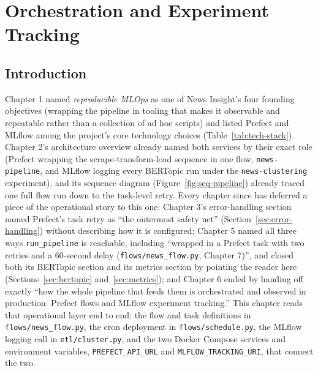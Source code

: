 \chapter{Orchestration and Experiment Tracking}

\section{Introduction}
\label{sec:orch-intro}
\begin{sloppypar}
Chapter 1 named \emph{reproducible MLOps} as one of News Insight's four founding objectives (wrapping the pipeline in tooling that makes it observable and repeatable rather than a collection of ad hoc scripts) and listed Prefect and MLflow among the project's core technology choices (Table~\ref{tab:tech-stack}). Chapter 2's architecture overview already named both services by their exact role (Prefect wrapping the scrape-transform-load sequence in one flow, \texttt{news-pipeline}, and MLflow logging every BERTopic run under the \texttt{news-clustering} experiment), and its sequence diagram (Figure~\ref{fig:seq-pipeline}) already traced one full flow run down to the task-level retry. Every chapter since has deferred a piece of the operational story to this one: Chapter 3's error-handling section named Prefect's task retry as ``the outermost safety net'' (Section~\ref{sec:error-handling}) without describing how it is configured; Chapter 5 named all three ways \texttt{run\_pipeline} is reachable, including ``wrapped in a Prefect task with two retries and a 60-second delay (\texttt{flows/\allowbreak news\_flow.py}, Chapter 7)'', and closed both its BERTopic section and its metrics section by pointing the reader here (Sections~\ref{sec:bertopic} and~\ref{sec:metrics}); and Chapter 6 ended by handing off exactly ``how the whole pipeline that feeds them is orchestrated and observed in production: Prefect flows and MLflow experiment tracking.'' This chapter reads that operational layer end to end: the flow and task definitions in \texttt{flows/\allowbreak news\_flow.py}, the cron deployment in \texttt{flows/\allowbreak schedule.py}, the MLflow logging call in \texttt{etl/\allowbreak cluster.py}, and the two Docker Compose services and environment variables, \texttt{PREFECT\_API\_URL} and \texttt{MLFLOW\_TRACKING\_URI}, that connect the two.
\end{sloppypar}


